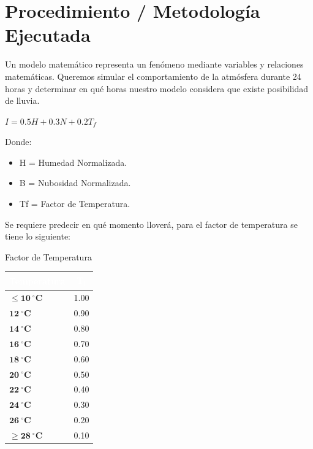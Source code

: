 \documentclass[11pt,a4paper]{article}
\renewcommand{\arraystretch}{1.08}
\begin{document}
\section{Procedimiento / Metodología Ejecutada}
Un modelo matemático representa un fenómeno mediante variables y relaciones matemáticas. Queremos simular el comportamiento de la atmósfera durante 24 horas y determinar en qué horas nuestro modelo considera que existe posibilidad de lluvia.
\centerline{$I=0.5H+0.3N+0.2T_f$}
Donde:
\begin{itemize}
    \item H = Humedad Normalizada.
    \item B = Nubosidad Normalizada.
    \item Tf = Factor de Temperatura.
\end{itemize}
Se requiere predecir en qué momento lloverá, para el factor de temperatura se tiene lo siguiente: \\
\centerline{Factor de Temperatura}
\begin{table}[h!]
\centering
{}
\setlength{\arrayrulewidth}{0.75pt}
\renewcommand{\arraystretch}{1.25}
\begin{tabular}{|l|c|}
\hline
\rowcolor{headerblue}
\textbf{\textcolor{white}{Temperatura}} & \textbf{\textcolor{white}{T\textsubscript{f}}} \\ \hline
$\mathbf{\le 10\ ^\circ C}$ & 1.00 \\ \hline
\rowcolor{rowlight}
$\mathbf{12\ ^\circ C}$ & 0.90 \\ \hline
$\mathbf{14\ ^\circ C}$ & 0.80 \\ \hline
\rowcolor{rowlight}
$\mathbf{16\ ^\circ C}$ & 0.70 \\ \hline
$\mathbf{18\ ^\circ C}$ & 0.60 \\ \hline
\rowcolor{rowlight}
$\mathbf{20\ ^\circ C}$ & 0.50 \\ \hline
$\mathbf{22\ ^\circ C}$ & 0.40 \\ \hline
\rowcolor{rowlight}
$\mathbf{24\ ^\circ C}$ & 0.30 \\ \hline
$\mathbf{26\ ^\circ C}$ & 0.20 \\ \hline
\rowcolor{rowlight}
$\mathbf{\ge 28\ ^\circ C}$ & 0.10 \\ \hline
\end{tabular}
\end{table}
\end{document}
